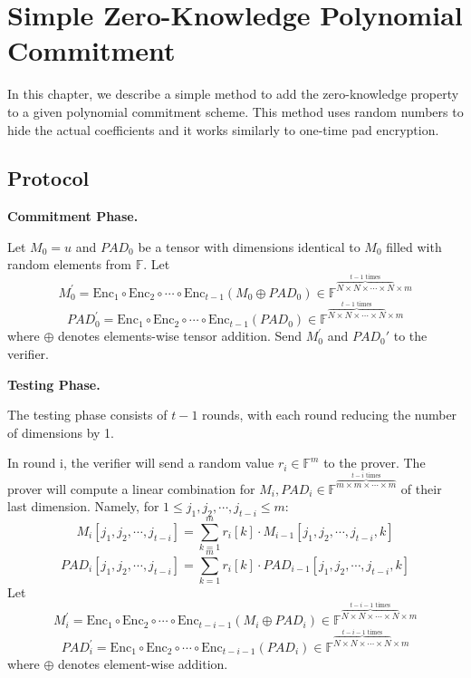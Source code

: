 \chapter{Simple Zero-Knowledge Polynomial Commitment}

In this chapter, we describe a simple method to add the zero-knowledge property to a given polynomial commitment scheme. This method uses random numbers to hide the actual coefficients and it works similarly to one-time pad encryption.

\section{Protocol}

\textbf{Commitment Phase.}

Let $M_0 = u$ and $PAD_0$ be a tensor with dimensions identical to $M_0$ filled with random elements from $\mathbb{F}$.
Let 
$$
    M_0^{\prime} = \text{Enc}_1 \circ \text{Enc}_2 \circ \cdots \circ \text{Enc}_{t-1} (M_0 \oplus PAD_0) \in \mathbb{F}^{\overbrace{N \times N \times \cdots \times N}^{t-1 \text{ times}} \times m}
$$
$$
    PAD_0^{\prime} = \text{Enc}_1 \circ \text{Enc}_2 \circ \cdots \circ \text{Enc}_{t-1} (PAD_0) \in \mathbb{F}^{\overbrace{N \times N \times \cdots \times N}^{t-1 \text{ times}} \times m}
$$
where $\oplus$ denotes elements-wise tensor addition.
Send $M_0^{\prime}$ and $PAD_0\prime$ to the verifier.

\textbf{Testing Phase.}

The testing phase consists of $t-1$ rounds, with each round reducing the number of dimensions by 1.

In round i, the verifier will send a random value $r_i \in \mathbb{F}^m$ to the prover.
The prover will compute a linear combination for $M_i, PAD_i \in \mathbb{F}^{\overbrace{m \times m \times \cdots \times m}^{t-i \text{ times}}}$ of their last dimension.
Namely, for $1 \le j_1,j_2, \cdots, j_{t-i} \le m$:
$$
    M_i[j_1,j_2, \cdots, j_{t-i}] = \sum_{k=1}^{m} r_{i}[k] \cdot M_{i-1}[j_1,j_2, \cdots, j_{t-i}, k]
$$
$$
    PAD_i[j_1,j_2, \cdots, j_{t-i}] = \sum_{k=1}^{m} r_{i}[k] \cdot PAD_{i-1}[j_1,j_2, \cdots, j_{t-i}, k]
$$
Let 
$$
M_i^\prime = \text{Enc}_1 \circ \text{Enc}_2 \circ \cdots \circ \text{Enc}_{t - i - 1}(M_i \oplus PAD_i)\in \mathbb{F}^{\overbrace{N \times N \times \cdots \times N}^{t-i-1 \text{ times}} \times m}
$$
$$
PAD_i^\prime = \text{Enc}_1 \circ \text{Enc}_2 \circ \cdots \circ \text{Enc}_{t - i - 1}(PAD_i)\in \mathbb{F}^{\overbrace{N \times N \times \cdots \times N}^{t-i-1 \text{ times}} \times m}
$$
where $\oplus$ denotes element-wise addition.

